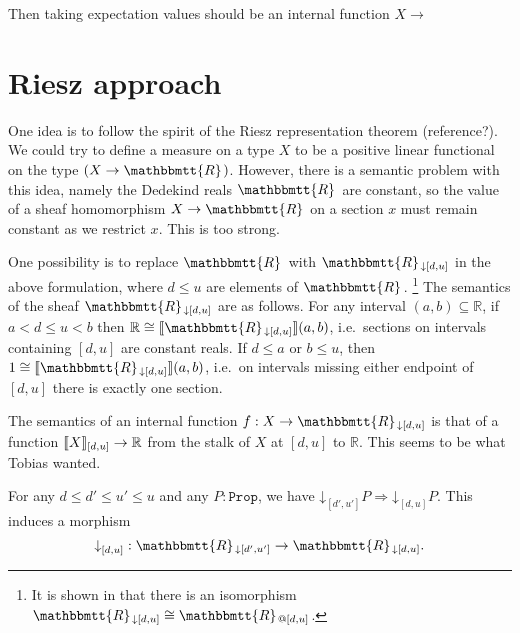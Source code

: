 \documentclass[11pt, oneside, article]{memoir}
\makeatletter
\theoremstyle{plain}
\theoremstyle{definition}
\theoremstyle{remark}
\renewcommand{\ss}{\subseteq}
\DeclarePairedDelimiter{\church}{\llbracket}{\rrbracket}
\newcommand{\const}[1]{\mathtt{#1}}
\newcommand{\internal}[1]{\raisebox{-.03ex}{$\mathbbmtt{#1}$}}
\newcommand{\hs}{\hspace{1.1pt}}
\newcommand{\RR}{\mathbb{R}}
\newcommand{\tRR}{\internal{R}\hs}
\newcommand{\tRRat}[1]{\tRR_{\SeeInline{#1}}}
\newcommand{\Prop}{\const{Prop}}
\newcommand{\SeeSymbol}{{\down}}  %
\newcommand{\See}[2][]{\SeeSymbol^{#1}_{#2}}
\newcommand{\AtInline}[1]{@{#1}}
\newcommand{\SeeInline}[1]{\SeeSymbol{#1}}
\newcommand{\down}{\mathord{\downarrow}}
\newcommand{\imp}{\Rightarrow}
\makeatother
\begin{document}
Then taking expectation values should be an internal function $X\to $

\chapter{Riesz approach}


One idea is to follow the spirit of the Riesz representation theorem (reference?). We could try to define a measure on a type $X$ to be a positive linear functional on the type $(X\to\tRR)$. However, there is a semantic problem with this idea, namely the Dedekind reals $\tRR$ are constant, so the value of a sheaf homomorphism $X\to\tRR$ on a section $x$ must remain constant as we restrict $x$. This is too strong.

One possibility is to replace $\tRR$ with $\tRRat{[d,u]}$ in the above formulation, where $d\leq u$ are elements of $\tRR$.%
\footnote{
It is shown in \cite[Prop 7.9]{Schultz.Spivak:2017a} that there is an isomorphism $\tRRat{[d,u]}\cong\tRR_{\AtInline{[d,u]}}$.
}
The semantics of the sheaf $\tRRat{[d,u]}$ are as follows. For any interval $(a,b)\ss\RR$, if $a<d\leq u<b$ then $\RR\cong\church{\tRRat{[d,u]}}(a,b)$, i.e.\ sections on intervals containing $[d,u]$ are constant reals. If $d\leq a$ or $b\leq u$, then $1\cong\church{\tRRat{[d,u]}}(a,b)$, i.e.\ on intervals missing either endpoint of $[d,u]$ there is exactly one section.

The semantics of an internal function $f:X\to\tRRat{[d,u]}$ is that of a function $\church{X}_{[d,u]}\to\RR$ from the stalk of $X$ at $[d,u]$ to $\RR$. This seems to be what Tobias wanted.

For any $d\leq d'\leq u'\leq u$ and any $P:\Prop$, we have $\See{[d',u']}P\imp\See{[d,u]}P$. This induces a morphism
\begin{equation}
\label{Rlocalize}
	\See{[d,u]}:\tRRat{[d',u']}\to\tRRat{[d,u]}.
\end{equation}
\end{document}
